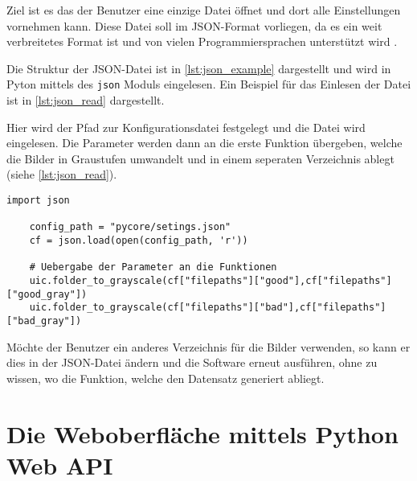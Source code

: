 Ziel ist es das der Benutzer eine einzige Datei öffnet und dort alle Einstellungen vornehmen kann. 
Diese Datei soll im \ac{JSON}-Format vorliegen, da es ein weit verbreitetes Format ist und von vielen Programmiersprachen unterstützt wird \cite{gur_diskussion_2024}.

Die Struktur der \ac{JSON}-Datei ist in \autoref{lst:json_example} dargestellt und wird in Pyton mittels des \texttt{json} Moduls eingelesen. Ein Beispiel für das Einlesen der Datei ist in \autoref{lst:json_read} dargestellt.

Hier wird der Pfad zur Konfigurationsdatei festgelegt und die Datei wird eingelesen. Die Parameter werden dann an die erste Funktion übergeben, welche die Bilder in Graustufen umwandelt und in einem seperaten Verzeichnis ablegt (siehe \autoref{lst:json_read}). 

\begin{lstlisting}[style=python, label=lst:json_read, caption={Einlesen der \ac{JSON}-Datei}]
    import json

    config_path = "pycore/setings.json"
    cf = json.load(open(config_path, 'r'))

    # Uebergabe der Parameter an die Funktionen
    uic.folder_to_grayscale(cf["filepaths"]["good"],cf["filepaths"]["good_gray"])
    uic.folder_to_grayscale(cf["filepaths"]["bad"],cf["filepaths"]["bad_gray"])

\end{lstlisting}

Möchte der Benutzer ein anderes Verzeichnis für die Bilder verwenden, so kann er dies in der \ac{JSON}-Datei ändern und die Software erneut ausführen, ohne zu wissen, wo die Funktion, welche den Datensatz generiert abliegt.

\section{Die Weboberfläche mittels Python Web API} \label{sec:weboberflaeche}